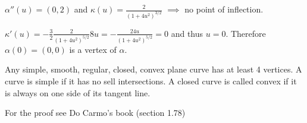 $\alpha''(u) = (0,2)$ and $\kappa (u) = \frac{2}{(1+4u^2)^{3/2}}$ $\implies$ no point of inflection.

$\kappa'(u) = - \frac{3}{2} \frac{2}{(1+4u^2)^{5/2}} 8u = - \frac{24 u}{(1+4u^2)^{5/2}} = 0$ and thus $u=0$. Therefore $\alpha(0) = (0,0)$ is a vertex of $\alpha$.


\vspace{\baselineskip}

Any simple, smooth, regular, closed, convex plane curve has at least 4 vertices. A curve is simple if it has no sell intersections. A closed curve is called convex if it is always on one side of its tangent line.

For the proof see Do Carmo's book (section 1.78)